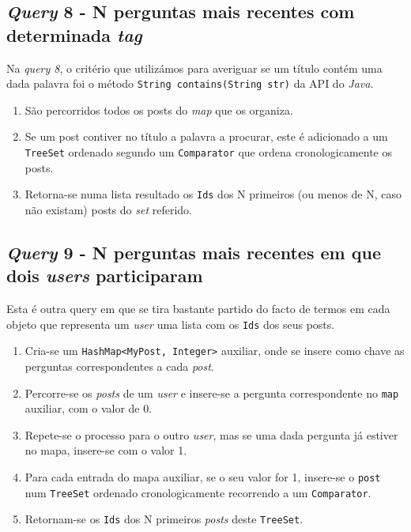 \documentclass[10pt]{article}
\begin{document}
	\subsection*{\textit{Query} 8 - N perguntas mais recentes com determinada \textit{tag}}
		Na \textit{query 8}, o critério que utilizámos para averiguar 
	se um título contém uma dada palavra foi o método 
	\texttt{String contains(String str)} da API do \textit{Java}.
			\begin{enumerate}
				\item São percorridos todos os posts do \textit{map} 
			que os organiza.
				\item Se um post contiver no título a palavra a 
			procurar, este é adicionado a um \texttt{TreeSet} 
			ordenado segundo um \texttt{Comparator} que ordena 
			cronologicamente os posts.
				\item Retorna-se numa lista resultado os \texttt{Ids} 
				dos N primeiros (ou menos de N, caso não existam) posts 
				do \textit{set} referido.
			\end{enumerate}
	\subsection*{\textit{Query} 9 - N perguntas mais recentes em que dois \textit{users} participaram}
	Esta é outra query em que se tira bastante partido do facto de termos em cada objeto que representa um \textit{user} uma lista com 
os \texttt{Ids} dos seus posts.

			\begin{enumerate}
				\item Cria-se um \texttt{HashMap<MyPost, Integer>} 
			auxiliar, onde se insere como chave as perguntas 
			correspondentes a cada \textit{post}.
				\item Percorre-se os \textit{posts} de um \textit{user} 
			e insere-se a pergunta correspondente 
			no \texttt{map} auxiliar, com o valor de 0.
				\item Repete-se o processo para o outro \textit{user},
			mas se uma dada pergunta já estiver no mapa, insere-se 
			com o valor 1.
				\item Para cada entrada do mapa auxiliar, se o seu 
			valor for 1, insere-se o \texttt{post} num \texttt{TreeSet}
			 ordenado cronologicamente recorrendo a um 
			 \texttt{Comparator}.
			 	\item Retornam-se os \texttt{Ids} dos N primeiros  
			 \textit{posts} deste \texttt{TreeSet}.			
			\end{enumerate}
\end{document}
